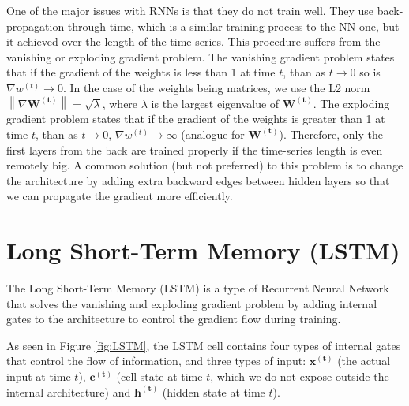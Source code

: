 One of the major issues with RNNs is that they do not train well. They use back-propagation through time, which is a similar training process to the NN one, but it achieved over the length of the time series. This procedure suffers from the vanishing or exploding gradient problem. The vanishing gradient problem states that if the gradient of the weights is less than 1 at time $t$, than as $t \xrightarrow{} 0$ so is $\nabla w^{(t)} \xrightarrow{} 0$. In the case of the weights being matrices, we use the L2 norm $\left\lVert \nabla \boldsymbol{W^{(t)}} \right\rVert = \sqrt{\lambda}$, where $\lambda$ is the largest eigenvalue of $\boldsymbol{W^{(t)}}$. The exploding gradient problem states that if the gradient of the weights is greater than 1 at time $t$, than as $t \xrightarrow{} 0$, $\nabla w^{(t)} \xrightarrow{} \infty$ (analogue for $\boldsymbol{W^{(t)}}$). Therefore, only the first layers from the back are trained properly if the time-series length is even remotely big. A common solution (but not preferred) to this problem is to change the architecture by adding extra backward edges between hidden layers so that we can propagate the gradient more efficiently.

\section{Long Short-Term Memory (LSTM)}
The Long Short-Term Memory (LSTM) \cite{hochreiter1997long, LSTM_blog} is a type of Recurrent Neural Network that solves the vanishing and exploding gradient problem by adding internal gates to the architecture to control the gradient flow during training.

As seen in Figure \ref{fig:LSTM}, the LSTM cell contains four types of internal gates that control the flow of information, and three types of input: $\boldsymbol{x^{(t)}}$ (the actual input at time $t$), $\boldsymbol{c^{(t)}}$ (cell state at time $t$, which we do not expose outside the internal architecture) and $\boldsymbol{h^{(t)}}$ (hidden state at time $t$).

